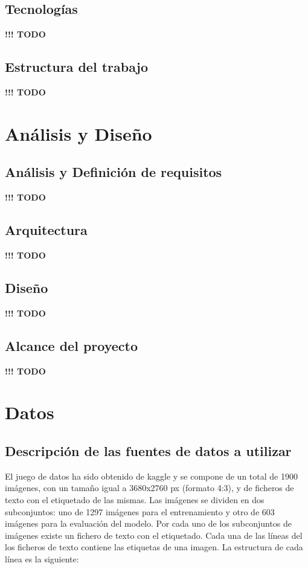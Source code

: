 \documentclass[]{article}
\begin{document}
\subsection{Tecnologías}

\textbf{!!! TODO}

\subsection{Estructura del trabajo}

\textbf{!!! TODO}

\section{Análisis y Diseño}

\subsection{Análisis y Definición de requisitos}

\textbf{!!! TODO}

\subsection{Arquitectura}

\textbf{!!! TODO}

\subsection{Diseño}

\textbf{!!! TODO}

\subsection{Alcance del proyecto}

\textbf{!!! TODO}


\section{Datos}

\subsection{Descripción de las fuentes de datos a utilizar}

El juego de datos ha sido obtenido de kaggle \cite{potholedataset} y se compone de un total de 1900 imágenes, con un tamaño igual a 3680x2760 px (formato 4:3), y de ficheros de texto con el etiquetado de las mismas. Las imágenes se dividen en dos subconjuntos: uno de 1297 imágenes para el entrenamiento y otro de 603 imágenes para la evaluación del modelo. Por cada uno de los subconjuntos de imágenes existe un fichero de texto con el etiquetado. Cada una de las líneas del los ficheros de texto contiene las etiquetas de una imagen. La estructura de cada línea es la siguiente:
\end{document}
